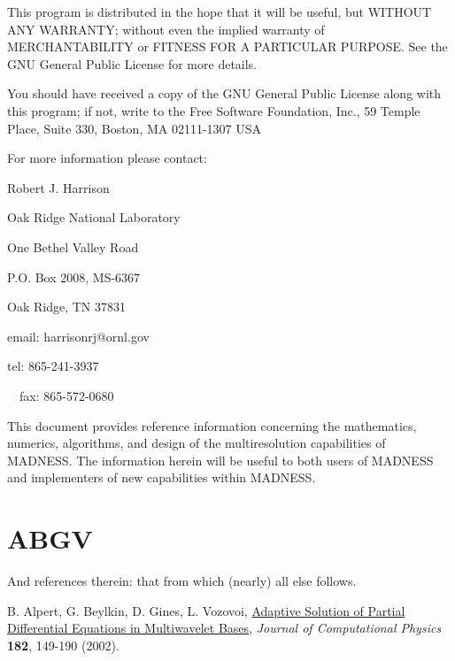 \documentclass[letterpaper]{article}
\begin{document}
This program is distributed in the hope that it will be useful, but WITHOUT ANY WARRANTY; without even the implied
warranty of MERCHANTABILITY or FITNESS FOR A PARTICULAR PURPOSE. See the GNU General Public License for more details.

You should have received a copy of the GNU General Public License along with this program; if not, write to the Free
Software Foundation, Inc., 59 Temple Place, Suite 330, Boston, MA 02111-1307 USA

For more information please contact:

Robert J. Harrison

Oak Ridge National Laboratory

One Bethel Valley Road

P.O. Box 2008, MS-6367

Oak Ridge, TN 37831


\bigskip

email: harrisonrj@ornl.gov 

tel: 865-241-3937

\ \ fax: 865-572-0680

\clearpage\setcounter{page}{1}\pagestyle{Blankleftpage}
\thispagestyle{TOCfirstpage}

\bigskip

\setcounter{tocdepth}{10}
\renewcommand\contentsname{Table of Contents}
\tableofcontents

\bigskip


\bigskip


\bigskip

\clearpage\setcounter{page}{1}\pagestyle{RightPage}
\thispagestyle{Blankleftpage}

\bigskip

\clearpage\clearpage\setcounter{page}{1}\pagestyle{LeftPage}
\thispagestyle{Firstrightnumberedpage}

This document provides reference information concerning the mathematics, numerics, algorithms, and design of the
multiresolution capabilities of MADNESS. The information herein will be useful to both users of MADNESS and
implementers of new capabilities within MADNESS.

\section{ABGV}
And references therein: that from which (nearly) all else follows.

B. Alpert, G. Beylkin, D. Gines, L. Vozovoi, \href{http://math.nist.gov/~BAlpert/mwpde.pdf}{Adaptive Solution of Partial
Differential Equations in Multiwavelet Bases,} \textit{Journal of Computational Physics }\textbf{182}, 149-190 (2002). 
\end{document}
